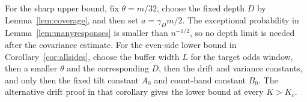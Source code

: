 For the sharp upper bound, fix $\theta=m/32$, choose the fixed depth $D$ by Lemma~\ref{lem:coverage}, and then set $a=\gamma_Dm/2$. The exceptional probability in Lemma~\ref{lem:manyresponses} is smaller than $n^{-1/2}$, so no depth limit is needed after the covariance estimate. For the even-side lower bound in Corollary~\ref{cor:allsides}, choose the buffer width $L$ for the target odds window, then a smaller $\theta$ and the corresponding $D$, then the drift and variance constants, and only then the fixed tilt constant $A_0$ and count-band constant $B_0$. The alternative drift proof in that corollary gives the lower bound at every $K>K_c$.
